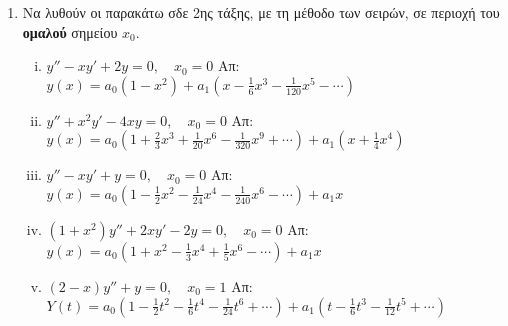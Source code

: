 



\pagestyle{askhseis}



\begin{center}
  \minibox{\large\bfseries  \textcolor{Col1}{Ασκήσεις στη μέθοδο Σειρών}}
\end{center}

\vspace{\baselineskip}

\begin{enumerate}
  \item  Να λυθούν οι παρακάτω σδε 2ης τάξης, με τη μέθοδο των σειρών, σε περιοχή του
    \textbf{ομαλού} σημείου $ x_{0} $. 
    \begin{enumerate}[i)]
      \item $ y'' - xy' + 2y = 0, \quad  x_{0} = 0 $ 
        \hfill Απ: $ \scriptstyle{ y(x) = a_{0} \left(1 - x^{2}\right)} + a_{1} 
        \left(x - \frac{1}{6}x^{3} - \frac{1}{120}x^{5} - \cdots \right) $ 
      \item $ y'' + x^{2}y' - 4xy = 0, \quad x_{0} = 0 $ 
        \hfill Απ: $ \scriptstyle {y(x) = a_{0}\left(1 + \frac{2}{3} x^{3} + 
            \frac{1}{20} x^{6} - \frac{1}{320} x^{9} + \cdots\right) + a_{1}
          \left(x + \frac{1}{4} x^{4}\right)} $  
      \item $ y'' - xy' + y = 0, \quad x_{0} = 0 $ 
        \hfill Απ: $ \scriptstyle{ y(x) = a_{0}\left(1 - \frac{1}{2} x^{2} - 
        \frac{1}{24} x^{4} - \frac{1}{240} x^{6} - \cdots\right)} + a_{1} x $ 
      \item $ (1+x^{2})y'' + 2xy' - 2y = 0, \quad x_{0} = 0  $ 
        \hfill Απ: $ \scriptstyle{ y(x) = a_{0}\left(1 + x^{2} - \frac{1}{3} x^{4} + 
        \frac{1}{5} x^{6} - \cdots\right) + a_{1} x }$  
      \item \label{eq:5} $ (2-x)y'' + y = 0, \quad x_{0} = 1$ 
        \hfill Απ: $ \scriptstyle{ Y(t) = a_{0}\left(1 - \frac{1}{2} t^{2} - 
        \frac{1}{6} t^{4} - \frac{1}{24} t^{6} + \cdots\right) + a_{1}
      \left(t - \frac{1}{6}t^{3} - \frac{1}{12}t^{5} + \cdots \right)}$ 
    \end{enumerate}


\end{enumerate}

